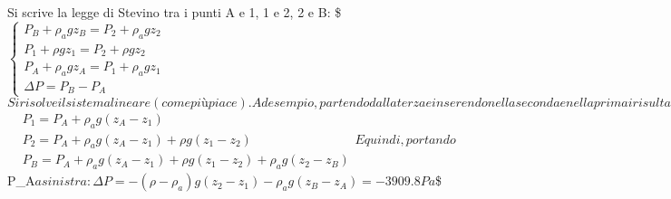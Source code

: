 \documentclass[letterpaper,10pt,italian]{jupyterBook}
\begin{document}
\sphinxAtStartPar
{} Si scrive la legge di Stevino tra i punti A e 1, 1 e 2, 2 e B:
\$\(\label{eqn:stevino:underdet}
\begin{cases}
  P_B + \rho_a g z_B = P_2 + \rho_a g z_2  \\
  P_1 + \rho g z_1 = P_2 + \rho g z_2   \\
  P_A + \rho_a g z_A = P_1 + \rho_a g z_1 \\
  \Delta P = P_B - P_A 
\end{cases}\)\( Si risolve il sistema lineare (come più piace). Ad
esempio, partendo dalla terza e inserendo nella seconda e nella prima i
risultati trovati: \)\(\begin{aligned}
 & P_1 = P_A + \rho_a g (z_A - z_1) \\
 & P_2 = P_A + \rho_a g (z_A - z_1) + \rho g (z_1 - z_2) \\
 & P_B = P_A + \rho_a g (z_A - z_1) + \rho g (z_1 - z_2) + \rho_a g (z_2 - z_B)
\end{aligned}\)\( E quindi, portando \)P\_A\( a sinistra:
\)\(\Delta P = -(\rho - \rho_a) g ( z_2-z_1) - \rho_a g (z_B - z_A) = -3909.8 Pa\)\$
\end{document}

